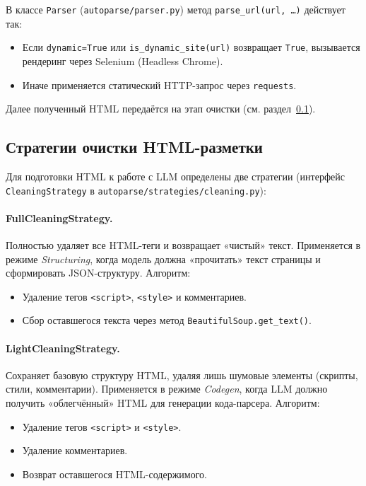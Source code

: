 В классе \texttt{Parser} (\texttt{autoparse/parser.py}) метод \texttt{parse\_url(url, \dots)} действует так:
\begin{itemize}
    \item Если \texttt{dynamic=True} или \texttt{is\_dynamic\_site(url)} возвращает \texttt{True}, вызывается рендеринг через Selenium (Headless Chrome).
    \item Иначе применяется статический HTTP-запрос через \texttt{requests}.
\end{itemize}
Далее полученный HTML передаётся на этап очистки (см. раздел~\ref{subsec:solution2}).

\subsection{Стратегии очистки HTML-разметки}
\label{subsec:solution2}

Для подготовки HTML к работе с LLM определены две стратегии (интерфейс \texttt{CleaningStrategy} в \texttt{autoparse/strategies/cleaning.py}):

\paragraph{FullCleaningStrategy.}
Полностью удаляет все HTML-теги и возвращает «чистый» текст. Применяется в режиме \emph{Structuring}, когда модель должна «прочитать» текст страницы и сформировать JSON-структуру. Алгоритм:
\begin{itemize}
    \item Удаление тегов \texttt{<script>}, \texttt{<style>} и комментариев.
    \item Сбор оставшегося текста через метод \texttt{BeautifulSoup.get\_text()}.
\end{itemize}

\paragraph{LightCleaningStrategy.}
Сохраняет базовую структуру HTML, удаляя лишь шумовые элементы (скрипты, стили, комментарии). Применяется в режиме \emph{Codegen}, когда LLM должно получить «облегчённый» HTML для генерации кода-парсера. Алгоритм:
\begin{itemize}
    \item Удаление тегов \texttt{<script>} и \texttt{<style>}.
    \item Удаление комментариев.
    \item Возврат оставшегося HTML-содержимого.
\end{itemize}


